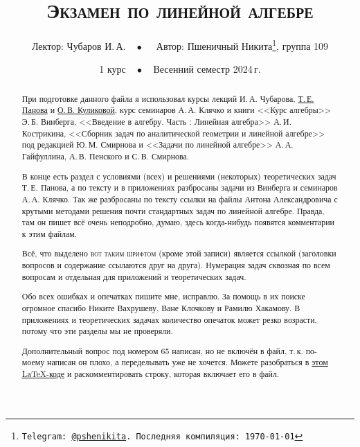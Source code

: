 \documentclass[a4paper, 11pt]{article}
\begin{document}
\let\hypercontentsline=\contentsline
\renewcommand{\contentsline}[4]{\hypertarget{toc.#4}{}\hypercontentsline{#1}{#2}{#3}{#4}}

\title{\bfseries\scshape Экзамен по линейной алгебре}
\date{1 курс$\quad\bullet\quad$Весенний семестр 2024\,г.}
\author{Лектор: Чубаров И.\,А.$\quad\bullet\quad$ Автор: Пшеничный Никита\thanks{\texttt{Telegram: \href{https://t.me/pshenikita}{@pshenikita}. Последняя компиляция: \today}}, группа 109}

\maketitle

\begin{abstract}
    При подготовке данного файла я использовал курсы лекций И.\,А. Чубарова, \href{http://higeom.math.msu.su/people/taras/#teaching}{Т.\,Е. Панова} и \href{http://halgebra.math.msu.su/wiki/lib/exe/fetch.php/28_lectures_02_06_20_.pdf}{О.\,В. Куликовой}, курс семинаров А.\,А. Клячко и книги <<Курс алгебры>> Э.\,Б. Винберга, <<Введение в алгебру. Часть : Линейная алгебра>> А.\,И. Кострикина, <<Сборник задач по аналитической геометрии и линейной алгебре>> под редакцией Ю.\,М. Смирнова и <<Задачи по линейной алгебре>> А.\,А. Гайфуллина, А.\,В. Пенского и С.\,В. Смирнова.

    В конце есть раздел с условиями (всех) и решениями (некоторых) теоретических задач Т.\,Е. Панова, а по тексту и в приложениях разбросаны задачи из Винберга и семинаров А.\,А. Клячко. Так же разбросаны по тексту ссылки на файлы Антона Александровича с крутыми методами решения почти стандартных задач по линейной алгебре. Правда, там он пишет всё очень неподробно, думаю, здесь когда-нибудь появятся комментарии к этим файлам.

    Всё, что выделено {\scshape вот таким шрифтом} (кроме этой записи) является ссылкой (заголовки вопросов и содержание ссылаются друг на друга). Нумерация задач сквозная по всем вопросам и отдельная для приложений и теоретических задач.

    Обо всех ошибках и опечатках пишите мне, исправлю. За помощь в их поиске огромное спасибо Никите Вахрушеву, Ване Клочкову и Рамилю Хакамову. В приложениях и теоретических задачах количество опечаток может резко возрасти, потому что эти разделы мы не проверяли.

    Дополнительный вопрос под номером 65 написан, но не включён в файл, т.\,к. по-моему написан он плохо, а переделывать уже не хочется. Можете разобраться в \href{https://github.com/pshenikita/linalg_exam/}{этом \LaTeX-коде} и раскомментировать строку, которая включает его в файл.
\end{abstract}
\end{document}
